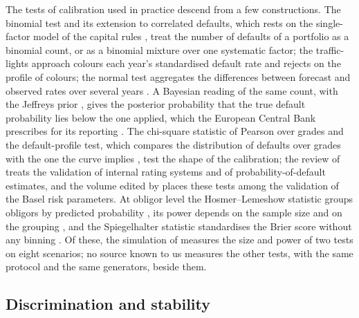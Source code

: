 The tests of calibration used in practice descend from a few constructions.
The binomial test and its extension to correlated defaults, which rests on the single-factor model of the capital rules \citep{gordy2003}, treat the number of defaults of a portfolio as a binomial count, or as a binomial mixture over one systematic factor; the traffic-lights approach colours each year's standardised default rate and rejects on the profile of colours; the normal test aggregates the differences between forecast and observed rates over several years \citep{bcbswp14}.
A Bayesian reading of the same count, with the Jeffreys prior \citep{jeffreys1946}, gives the posterior probability that the true default probability lies below the one applied, which the European Central Bank prescribes for its reporting \citep{ecb2019instructions}.
The chi-square statistic of Pearson \citep{pearson1900} over grades and the default-profile test, which compares the distribution of defaults over grades with the one the curve implies \citep{tasche2013}, test the shape of the calibration; the review of \citet{tasche2008} treats the validation of internal rating systems and of probability-of-default estimates, and the volume edited by \citet{engelmann2011} places these tests among the validation of the Basel risk parameters.
At obligor level the Hosmer--Lemeshow statistic groups obligors by predicted probability \citep{hosmer1980}, its power depends on the sample size and on the grouping \citep{hosmer1997,paul2013}, and the Spiegelhalter statistic standardises the Brier score without any binning \citep{spiegelhalter1986,brier1950}.
Of these, the simulation of \citet{bcbswp14} measures the size and power of two tests on eight scenarios; no source known to us measures the other tests, with the same protocol and the same generators, beside them.

\subsection{Discrimination and stability}
\label{sec:rw-discrimination}


